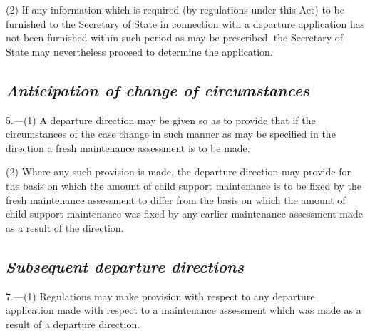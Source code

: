 \documentclass[12pt,a4paper]{article}
\begin{document}
(2) If any information which is required (by regulations under this Act) to be furnished to the Secretary of State in connection with a departure application has not been furnished within such period as may be prescribed, the Secretary of State may nevertheless proceed to determine the application.


\subsection*{\itshape Anticipation of change of circumstances}

5.---(1) A departure direction may be given so as to provide that if the circumstances of the case change in such manner as may be specified in the direction a fresh maintenance assessment is to be made.

(2) Where any such provision is made, the departure direction may provide for the basis on which the amount of child support maintenance is to be fixed by the fresh maintenance assessment to differ from the basis on which the amount of child support maintenance was fixed by any earlier maintenance assessment made as a result of the direction.


%
%

\subsection*{\itshape Subsequent departure directions}

7.---(1) Regulations may make provision with respect to any departure application made with respect to a maintenance assessment which was made as a result of a departure direction.
\end{document}
